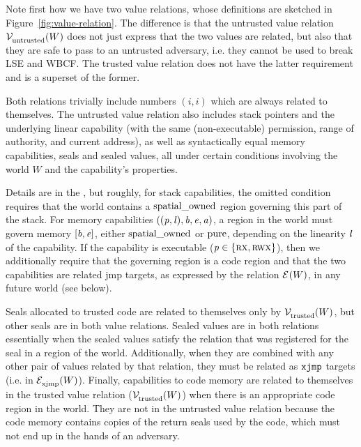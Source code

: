 \documentclass[acmsmall,screen]{acmart}\settopmatter{}
\renewcommand{\perm}{\var{p}}
\renewcommand{\lre}[1][]{\typesetlr{E}^{#1}}
\renewcommand{\lrexj}[1][]{\typesetlr{E}^{#1}_{\mathrm{xjmp}}}
\renewcommand{\lrvg}[2][]{\typesetlr{V}^{#1}_{#2}}
\renewcommand{\lrv}[1][]{\lrvg[#1]{\untrusted}}
\renewcommand{\lrvtrusted}[1][]{\lrvg[#1]{\trusted}}
\begin{document}
Note first how we have two value relations, whose definitions are sketched in Figure~\ref{fig:value-relation}.
The difference is that the untrusted value relation $\lrv(W)$ does not just express that the two values are related, but also that they are safe to pass to an untrusted adversary, i.e. they cannot be used to break LSE and WBCF.
The trusted value relation does not have the latter requirement and is a superset of the former.

Both relations trivially include numbers $(i,i)$ which are always related to themselves.
The untrusted value relation also includes stack pointers and the underlying linear capability (with the same (non-executable) permission, range of authority, and current address), as well as syntactically equal memory capabilities, seals and sealed values, all under certain conditions involving the world $W$ and the capability's properties.

Details are in the \cite{technical_report}, but roughly, for stack capabilities, the omitted condition requires that the world contains a $\mathrm{spatial\_owned}$ region governing this part of the stack.
For memory capabilities $((\perm,\lin),\baddr,\eaddr,\aaddr)$, a region in the world must govern memory $[\mathit{b},\mathit{e}]$, either $\mathrm{spatial\_owned}$ or $\mathrm{pure}$, depending on the linearity $\mathit{l}$ of the capability.
If the capability is executable ($\perm \in \{\rx,\rwx\}$), then we additionally require that the governing region is a code region and that the two capabilities are related $\mathrm{jmp}$ targets, as expressed by the relation $\lre(W)$, in any future world (see below).

Seals allocated to trusted code are related to themselves only by $\lrvtrusted(W)$, but other seals are in both value relations.
Sealed values are in both relations essentially when the sealed values satisfy the relation that was registered for the seal in a region of the world.
Additionally, when they are combined with any other pair of values related by that relation, they must be related as $\txjmp{}{}$ targets (i.e. in $\lrexj(W)$).
Finally, capabilities to code memory are related to themselves in the trusted value relation ($\lrvtrusted(W)$) when there is an appropriate code region in the world.
They are not in the untrusted value relation because the code memory contains copies of the return seals used by the code, which must not end up in the hands of an adversary.
\end{document}
